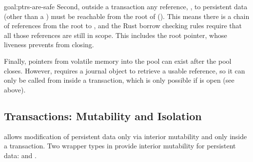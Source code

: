 \begin{goaltrue}{goal:ptrs-are-safe}
Second, outside a transaction any reference, , to persistent data
(other than a ) must be reachable from the root of 
().  This means there is a chain of references
from the root to , and the Rust borrow checking rules require that all
those references are still in scope.  This includes the root pointer, whose
liveness prevents  from closing.

Finally,  pointers from volatile memory into the pool can exist
after the pool closes.  However,  requires a journal
object to retrieve a usable reference, so it can only be called from inside a
transaction, which is only possible if  is open (see above).



\end{goaltrue}
  
\subsection{Transactions: Mutability and Isolation}

\This{} allows modification of persistent data only via interior mutability
and only inside a transaction.
Two wrapper types in  provide interior mutability for persistent data:
 and .%

